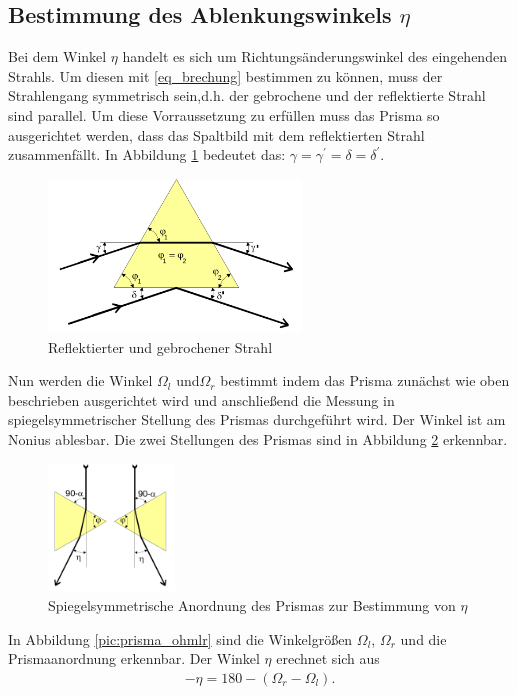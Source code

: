 \subsection{Bestimmung des Ablenkungswinkels $\eta$}	
Bei dem Winkel $\eta$ handelt es sich um Richtungsänderungswinkel des eingehenden Strahls. Um diesen mit \eqref{eq_brechung} bestimmen 
zu können, muss der Strahlengang symmetrisch sein,d.h. der gebrochene und der reflektierte Strahl sind parallel. Um diese Vorraussetzung 
zu erfüllen muss das Prisma so ausgerichtet werden, dass das Spaltbild mit dem reflektierten Strahl zusammenfällt. In Abbildung 
\ref{pic_prismaeta} bedeutet das: $\gamma=\gamma^{\prime}=\delta=\delta^{\prime}$.
\begin{figure}[H]
\includegraphics[width=0.6\textwidth]{pics/prisma_eta.png}
\caption{Reflektierter und gebrochener Strahl}
\label{pic_prismaeta}
\end{figure}
Nun werden die Winkel $\Omega_l$ und$\Omega _r$ bestimmt indem das Prisma zunächst wie oben beschrieben ausgerichtet wird und anschließend die Messung in spiegelsymmetrischer Stellung des Prismas durchgeführt wird. Der Winkel ist am Nonius ablesbar.
Die zwei Stellungen des Prismas sind in Abbildung \ref{pic:prisma_etasym} erkennbar.
\begin{figure}[H]
\includegraphics[width=0.3\textwidth]{pics/prisma_ohm.png}
\caption{Spiegelsymmetrische Anordnung des Prismas zur Bestimmung von $\eta$}
\label{pic:prisma_etasym}
\end{figure}
In Abbildung \ref{pic:prisma_ohmlr} sind die Winkelgrößen $\Omega_l$, $\Omega_r$ und die Prismaanordnung erkennbar. 
Der Winkel $\eta$ erechnet sich aus
\begin{align}
-\eta = 180 -(\Omega_r-\Omega_l).
\label{eq:eta_ohm_rl}
\end{align}
	
